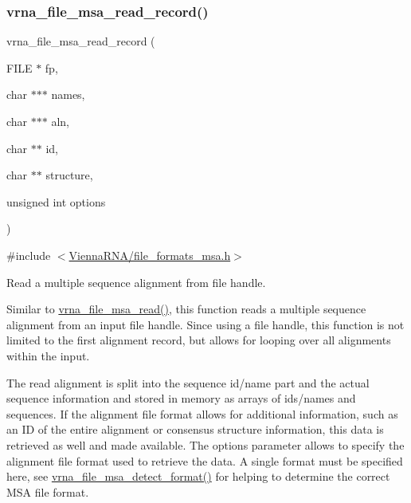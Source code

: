 \mbox{\label{group__file__utils_ga59204cd1daa4927f5127cc65a2886efd}} 
\subsubsection{\texorpdfstring{vrna\+\_\+file\+\_\+msa\+\_\+read\+\_\+record()}{vrna\_file\_msa\_read\_record()}}
{\footnotesize\ttfamily vrna\+\_\+file\+\_\+msa\+\_\+read\+\_\+record (\begin{DoxyParamCaption}\item[{F\+I\+LE $\ast$}]{fp,  }\item[{char $\ast$$\ast$$\ast$}]{names,  }\item[{char $\ast$$\ast$$\ast$}]{aln,  }\item[{char $\ast$$\ast$}]{id,  }\item[{char $\ast$$\ast$}]{structure,  }\item[{unsigned int}]{options }\end{DoxyParamCaption})}



{\ttfamily \#include $<$\hyperlink{file__formats__msa_8h}{Vienna\+R\+N\+A/file\+\_\+formats\+\_\+msa.\+h}$>$}



Read a multiple sequence alignment from file handle. 

Similar to \hyperlink{group__file__utils_ga08a01c40ac5f5e0e04e9ae2258c99aa6}{vrna\+\_\+file\+\_\+msa\+\_\+read()}, this function reads a multiple sequence alignment from an input file handle. Since using a file handle, this function is not limited to the first alignment record, but allows for looping over all alignments within the input.

The read alignment is split into the sequence id/name part and the actual sequence information and stored in memory as arrays of ids/names and sequences. If the alignment file format allows for additional information, such as an ID of the entire alignment or consensus structure information, this data is retrieved as well and made available. The {\ttfamily options} parameter allows to specify the alignment file format used to retrieve the data. A single format must be specified here, see \hyperlink{group__file__utils_ga627ac281b5f11c63861726e6472626c9}{vrna\+\_\+file\+\_\+msa\+\_\+detect\+\_\+format()} for helping to determine the correct M\+SA file format.

